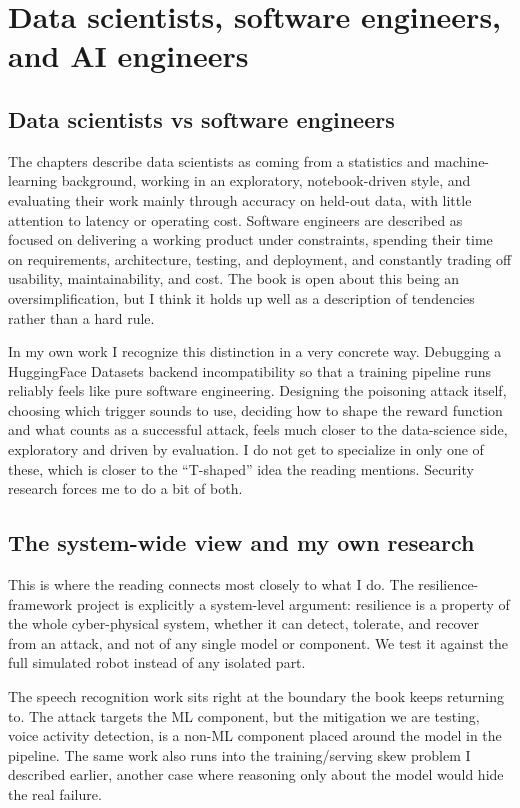 \documentclass[11pt,a4paper]{article}
\begin{document}
\section{Data scientists, software engineers, and AI engineers}


\subsection{Data scientists vs software engineers}

The chapters describe data scientists as coming from a statistics and machine-learning background, working in an exploratory, notebook-driven style, and evaluating their work mainly through accuracy on held-out data, with little attention to latency or operating cost. Software engineers are described as focused on delivering a working product under constraints, spending their time on requirements, architecture, testing, and deployment, and constantly trading off usability, maintainability, and cost. The book is open about this being an oversimplification, but I think it holds up well as a description of tendencies rather than a hard rule.

In my own work I recognize this distinction in a very concrete way. Debugging a HuggingFace Datasets backend incompatibility so that a training pipeline runs reliably feels like pure software engineering. Designing the poisoning attack itself, choosing which trigger sounds to use, deciding how to shape the reward function and what counts as a successful attack, feels much closer to the data-science side, exploratory and driven by evaluation. I do not get to specialize in only one of these, which is closer to the ``T-shaped'' idea the reading mentions. Security research forces me to do a bit of both.

\subsection{The system-wide view and my own research}

This is where the reading connects most closely to what I do. The resilience-framework project is explicitly a system-level argument: resilience is a property of the whole cyber-physical system, whether it can detect, tolerate, and recover from an attack, and not of any single model or component. We test it against the full simulated robot instead of any isolated part.

The speech recognition work sits right at the boundary the book keeps returning to. The attack targets the ML component, but the mitigation we are testing, voice activity detection, is a non-ML component placed around the model in the pipeline. The same work also runs into the training/serving skew problem I described earlier, another case where reasoning only about the model would hide the real failure.
\end{document}
